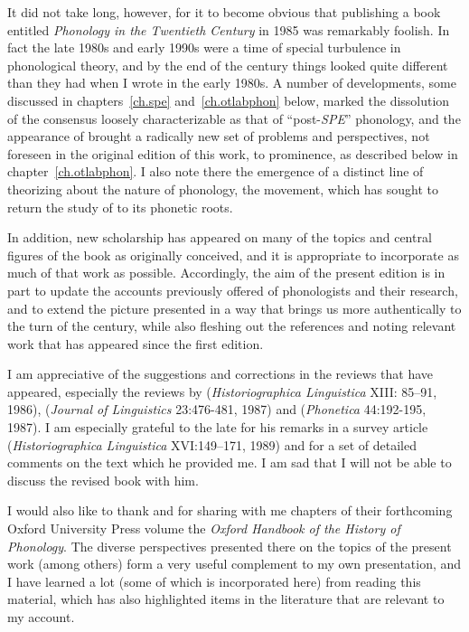 It did not take long, however, for it to become obvious that
publishing a book entitled \textsl{Phonology in the Twentieth Century}
in 1985 was remarkably foolish. In fact the late 1980s and early 1990s
were a time of special turbulence in phonological theory, and by the
end of the century things looked quite different than they had when I
wrote in the early 1980s. A number of developments, some discussed in
chapters~\ref{ch.spe} and~\ref{ch.otlabphon} below, marked the
dissolution of the consensus loosely characterizable as that of
``post-\textsl{SPE}'' phonology, and the appearance of
\citealt{prince:smolensky:optimality} brought a radically new set of
problems and perspectives, not foreseen in the original edition of
this work, to prominence, as described below in
chapter~\ref{ch.otlabphon}. I also note there the emergence of a
distinct line of theorizing about the nature of phonology, the 
 movement, which has sought to return the study of
 to its phonetic roots.

In addition, new scholarship has appeared on many of the topics and
central figures of the book as originally conceived, and it is
appropriate to incorporate as much of that work as
possible. Accordingly, the aim of the present edition is in part to
update the accounts previously offered of phonologists and their
research, and to extend the picture presented in a way that brings us
more authentically to the turn of the century, while also fleshing out
the references and noting relevant work that has appeared since the
first edition.

I am appreciative of the suggestions and corrections in the reviews
that have appeared, especially the reviews by 
(\textsl{Historiographica Linguistica} XIII: 85--91, 1986), 
(\textsl{Journal of Linguistics} 23:476-481, 1987) and 
 (\textsl{Phonetica} 44:192-195, 1987). I am
especially grateful to the late  for his remarks in a
survey article (\textsl{Historiographica Linguistica} XVI:149--171,
1989) and for a set of detailed comments on the text which he provided
me. I am sad that I will not be able to discuss the revised book with
him.

I would also like to thank  and  for sharing
with me chapters of their forthcoming Oxford University Press volume
the \textsl{Oxford Handbook of the History of Phonology}.  The diverse
perspectives presented there on the topics of the present work (among
others) form a very useful complement to my own presentation, and I
have learned a lot (some of which is incorporated here) from reading
this material, which has also highlighted items in the literature that
are relevant to my account.

